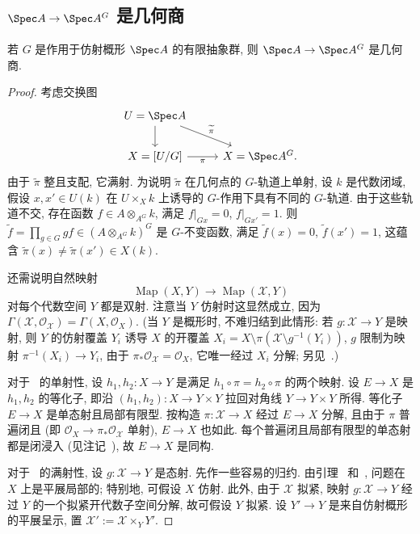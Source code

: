 \subsection{\texorpdfstring{$\Spec A\to\Spec A^G$}{Spec A → Spec AG} 是几何商}\label{src:5.2.4-subsection}
\begin{proposition}\label{src:5.2.11}
若 $G$ 是作用于仿射概形 $\Spec A$ 的有限抽象群, 则 $\Spec A\to\Spec A^G$ 是几何商.
\end{proposition}
\begin{proof}
考虑交换图
\[
\begin{tikzcd}
U=\Spec A\arrow[d]\arrow[dr,"\widetilde\pi"]&\\
\mathcal X={[U/G]}\arrow[r,"\pi"']&X=\Spec A^G.
\end{tikzcd}
\]
由于 $\widetilde\pi$ 整且支配, 它满射. 为说明 $\widetilde\pi$ 在几何点的 $G$-轨道上单射, 设 $k$ 是代数闭域, 假设 $x,x'\in U(k)$ 在 $U\times_X k$ 上诱导的 $G$-作用下具有不同的 $G$-轨道. 由于这些轨道不交, 存在函数 $f\in A\otimes_{A^G}k$, 满足 $f|_{Gx}=0$, $f|_{Gx'}=1$. 则 $\widetilde f=\prod_{g\in G}gf\in(A\otimes_{A^G}k)^G$ 是 $G$-不变函数, 满足 $\widetilde f(x)=0$, $\widetilde f(x')=1$, 这蕴含 $\widetilde\pi(x)\neq\widetilde\pi(x')\in X(k)$.

还需说明自然映射
\begin{equation}\label{src:5.2.12}
\operatorname{Map}(X,Y)\longrightarrow\operatorname{Map}(\mathcal X,Y)
\end{equation}
对每个代数空间 $Y$ 都是双射. 注意当 $Y$ 仿射时这显然成立, 因为 $\Gamma(\mathcal X,\mathcal O_{\mathcal X})=\Gamma(X,\mathcal O_X)$. (当 $Y$ 是概形时, 不难归结到此情形: 若 $g:\mathcal X\to Y$ 是映射, 则 $Y$ 的仿射覆盖 $Y_i$ 诱导 $X$ 的开覆盖 $X_i=X\setminus\pi(\mathcal X\setminus g^{-1}(Y_i))$, $g$ 限制为映射 $\pi^{-1}(X_i)\to Y_i$, 由于 $\pi_*\mathcal O_{\mathcal X}=\mathcal O_X$, 它唯一经过 $X_i$ 分解; 另见~\cite[\S$0.6$]{GIT}.)

对于~ 的单射性, 设 $h_1,h_2:X\to Y$ 是满足 $h_1\circ\pi=h_2\circ\pi$ 的两个映射. 设 $E\to X$ 是 $h_1,h_2$ 的等化子, 即沿 $(h_1,h_2):X\to Y\times Y$ 拉回对角线 $Y\to Y\times Y$ 所得. 等化子 $E\to X$ 是单态射且局部有限型. 按构造 $\pi:\mathcal X\to X$ 经过 $E\to X$ 分解, 且由于 $\pi$ 普遍闭且 (即 $\mathcal O_X\to\pi_*\mathcal O_{\mathcal X}$ 单射), $E\to X$ 也如此. 每个普遍闭且局部有限型的单态射都是闭浸入 (见注记~), 故 $E\to X$ 是同构.

对于~ 的满射性, 设 $g:\mathcal X\to Y$ 是态射. 先作一些容易的归约. 由引理~ 和~, 问题在 $X$ 上是平展局部的; 特别地, 可假设 $X$ 仿射. 此外, 由于 $\mathcal X$ 拟紧, 映射 $g:\mathcal X\to Y$ 经过 $Y$ 的一个拟紧开代数子空间分解, 故可假设 $Y$ 拟紧. 设 $Y'\to Y$ 是来自仿射概形的平展呈示, 置 $\mathcal X':=\mathcal X\times_Y Y'$.


\end{proof}
